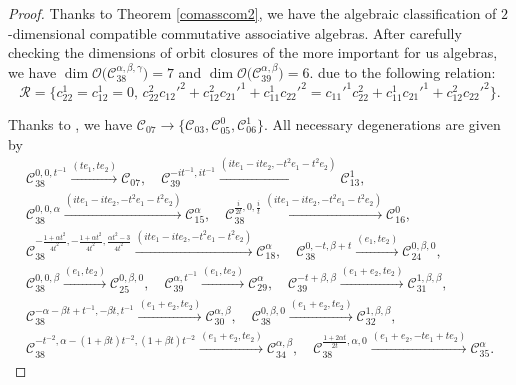 \documentclass[pdftex]{sigma}
\numberwithin{equation}{section}
\begin{document}
\begin{proof}
 Thanks to Theorem \ref{comasscom2}, we have the algebraic classification of
 $2$-dimensional compatible commutative associative algebras.
After carefully checking the dimensions of orbit closures of the more important for us algebras, we have
$\dim \mathcal{O}\bigl(\mathcal{C}_{38}^{\alpha,\beta,\gamma}\bigr) = 7 $ and $ \dim \mathcal{O}\bigl(\mathcal{C}_{39}^{\alpha,\beta}\bigr) = 6$.
 due to the following relation:
\[
\mathcal R=\big\{
c_{22}^1=c_{12}^1=0,\,
c_{22}^2 c_{12}'^2 + c_{12}^2 c_{21}'^1 + c_{11}^1 c_{22}'^2 = c_{11}'^1 c_{22}^2 + c_{11}^1 c_{21}'^1 + c_{12}^2 c_{22}'^2\big\}.
\]

Thanks to \cite{KV}, we have
$\mathcal{C}_{07} \to \big\{\mathcal{C}_{03}, \mathcal{C}_{05}^0, \mathcal{C}_{06}^1\big\}.$ All necessary degenerations are given by
\begin{gather*}
 \mathcal{C}_{38}^{0, 0, t^{-1}} \xrightarrow{ (te_1, t e_2)} \mathcal{C}_{07} ,\quad
 \mathcal{C}_{39}^{-it^{-1}, it^{-1}} \xrightarrow{ (i te_1-i te_2, -t^2e_1-t^2e_2)} \mathcal{C}_{13}^{1} , \\
 \mathcal{C}_{38}^{0, 0, \alpha} \xrightarrow{ (i te_1-i te_2, -t^2e_1-t^2e_2)} \mathcal{C}_{15}^{\alpha} ,\quad
 \mathcal{C}_{38}^{\frac{i}{2t}, 0, \frac{i}{t}} \xrightarrow{ (i te_1-i te_2, -t^2e_1-t^2e_2)} \mathcal{C}_{16}^{0} , \\
 \mathcal{C}_{38}^{-\frac{1+\alpha t^2}{4 t^2}, -\frac{1+\alpha t^2}{4 t^2}, \frac{\alpha t^2-3}{4t^2}} \xrightarrow{ (i te_1-i t e_2, -t^2e_1-t^2e_2)} \mathcal{C}_{18}^{\alpha} ,\quad \mathcal{C}_{38}^{0, -t, \beta+t} \xrightarrow{ (e_1, te_2)} \mathcal{C}_{24}^{0,\beta,0} , \\
 \mathcal{C}_{38}^{0, 0, \beta} \xrightarrow{ (e_1, te_2)} \mathcal{C}_{25}^{0,\beta,0} ,\quad
 \mathcal{C}_{39}^{\alpha, t^{-1}} \xrightarrow{ (e_1, te_2)} \mathcal{C}_{29}^{\alpha} , \quad \mathcal{C}_{39}^{-t+\beta, \beta} \xrightarrow{ (e_1+e_2, te_2)} \mathcal{C}_{31}^{1,\beta,\beta} ,\\
 \mathcal{C}_{38}^{-\alpha-\beta t +t^{-1}, - \beta t , t^{-1}} \xrightarrow{ (e_1+e_2, te_2)} \mathcal{C}_{30}^{\alpha, \beta} ,\quad \mathcal{C}_{38}^{0, \beta, 0} \xrightarrow{ (e_1+e_2, te_2)} \mathcal{C}_{32}^{1, \beta, \beta} , \\
 \mathcal{C}_{38}^{-t^{-2}, \alpha -(1+\beta t)t^{-2}, (1+\beta t)t^{-2}} \xrightarrow{ (e_1+e_2, te_2)} \mathcal{C}_{34}^{\alpha, \beta} , \quad \mathcal{C}_{38}^{\frac{1+2\alpha t}{2t}, \alpha, 0} \xrightarrow{ (e_1+e_2, -te_1+te_2)} \mathcal{C}_{35}^{\alpha}.\tag*{\qed}
 \end{gather*}\renewcommand{\qed}{}
\end{proof}
\end{document}
